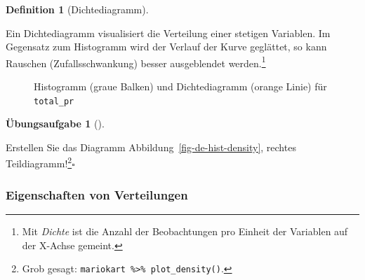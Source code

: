 \documentclass[
  a4paper,
  DIV=11]{scrreprt}
\theoremstyle{definition}
\newtheorem{exercise}{Übungsaufgabe}[chapter]
\theoremstyle{definition}
\theoremstyle{definition}
\newtheorem{definition}{Definition}[chapter]
\theoremstyle{remark}
\begin{document}
\begin{definition}[Dichtediagramm]\protect\hypertarget{def-dichtediagramm}{}\label{def-dichtediagramm}

Ein Dichtediagramm visualisiert die Verteilung einer stetigen Variablen.
Im Gegensatz zum Histogramm wird der Verlauf der Kurve geglättet, so
kann Rauschen (Zufallsschwankung) besser ausgeblendet werden.\footnote{Mit
  \emph{Dichte} ist die Anzahl der Beobachtungen pro Einheit der
  Variablen auf der X-Achse gemeint.}

\end{definition}

\begin{figure}


\caption{\label{fig-balken-total-pr-hist-dens}Histogramm (graue Balken)
und Dichtediagramm (orange Linie) für \texttt{total\_pr}}

\end{figure}%

\begin{exercise}[]\protect\hypertarget{exr-plot-density}{}\label{exr-plot-density}

Erstellen Sie das Diagramm Abbildung~\ref{fig-de-hist-density}, rechtes
Teildiagramm!\footnote{Grob gesagt:
  \texttt{mariokart\ \%\textgreater{}\%\ plot\_density()}.}\(\square\)

\end{exercise}

\subsubsection{Eigenschaften von
Verteilungen}\label{eigenschaften-von-verteilungen}
\end{document}
